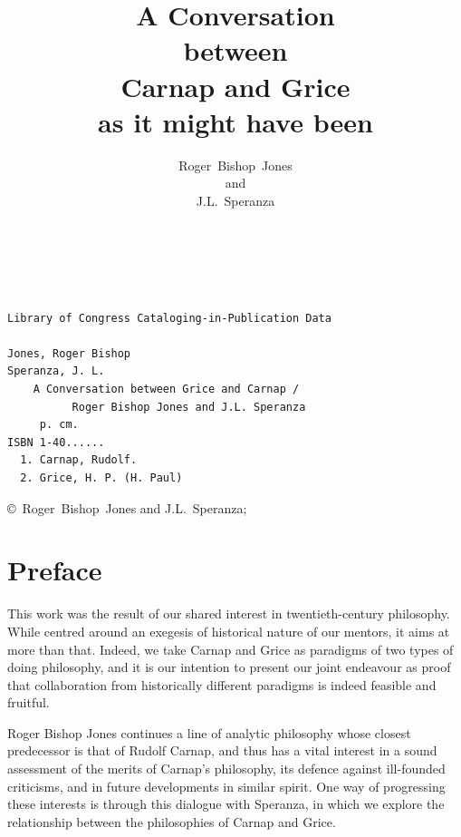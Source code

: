 \documentclass[10pt,titlepage]{book}
\title{A Conversation\\{\small between}\\Carnap and Grice\\{\small as it might have been}}
\author{Roger~Bishop~Jones\\\small{and}\\J.L.~Speranza}
\date{\ }
\begin{document}
\frontmatter
                               
\begin{titlepage}
\maketitle

\vfill


\begin{centering}

{\footnotesize
\begin{verbatim}

Library of Congress Cataloging-in-Publication Data

Jones, Roger Bishop
Speranza, J. L.
    A Conversation between Grice and Carnap /
          Roger Bishop Jones and J.L. Speranza
     p. cm.
ISBN 1-40......
  1. Carnap, Rudolf.
  2. Grice, H. P. (H. Paul)

\end{verbatim}

\copyright\ Roger~Bishop~Jones and J.L.~Speranza;
}%

\end{centering}
\end{titlepage}

\setcounter{tocdepth}{2}
{\parskip-0pt\tableofcontents}
\listoffigures

\mainmatter


\section*{Preface}
This work was the result of our shared interest in twentieth-century  
philosophy. While centred around an exegesis of historical nature of our  
mentors, it aims at more than that. Indeed, we take Carnap and Grice as  paradigms 
of two types of doing philosophy, and it is our intention to present  our 
joint endeavour as proof that collaboration from historically different  
paradigms is indeed feasible and fruitful.
 
Roger Bishop Jones continues a line of analytic philosophy whose closest predecessor
is that of Rudolf Carnap, and thus has a vital interest in a sound assessment of the
merits of Carnap's philosophy, its defence against ill-founded criticisms, and in
future developments in similar spirit.
One way of progressing these interests is through this dialogue with Speranza,
in which we explore the relationship between the philosophies of Carnap and Grice.
\end{document}

